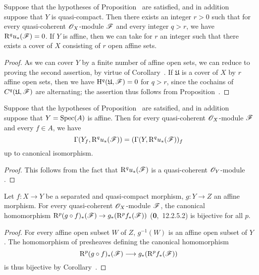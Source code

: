 \begin{corollary}[1.4.12]
\label{III.1.4.12}
Suppose that the hypotheses of Proposition~ are satisfied, and in addition suppose that $Y$ is quasi-compact.
Then there exists an integer $r>0$ such that for every quasi-coherent $\mathscr{O}_X$-module $\mathscr{F}$ and every integer $q>r$, we have $\mathrm{R}^q u_*(\mathscr{F})=0$.
If $Y$ is affine, then we can take for $r$ an integer such that there exists a cover of $X$ consisting of $r$ open affine sets.
\end{corollary}

\begin{proof}
\label{proof-III.1.4.12}
As we can cover $Y$ by a finite number of affine open sets, we can reduce to proving the second assertion, by virtue of Corollary~.
If $\mathfrak{U}$ is a cover of $X$ by $r$ affine open sets, then we have $\mathrm{H}^q(\mathfrak{U},\mathscr{F})=0$ for $q>r$, since the cochains of $C^q(\mathfrak{U},\mathscr{F})$ are alternating; the assertion thus follows from Proposition~.
\end{proof}

\begin{corollary}[1.4.13]
\label{III.1.4.13}
Suppose that the hypotheses of Proposition~ are satsified, and in addition suppose that $Y=\operatorname{Spec}(A)$ is affine.
Then for every quasi-coherent $\mathscr{O}_X$-module $\mathscr{F}$ and every $f\in A$, we have
\[
  \Gamma(Y_f,\mathrm{R}^q u_*(\mathscr{F}))=(\Gamma(Y,\mathrm{R}^q u_*(\mathscr{F}))_f
\]
up to canonical isomorphism.
\end{corollary}

\begin{proof}
\label{proof-III.1.4.13}
This follows from the fact that $\mathrm{R}^q u_*(\mathscr{F})$ is a quasi-coherent $\mathscr{O}_Y$-module .
\end{proof}

\begin{proposition}[1.4.14]
\label{III.1.4.14}
Let $f:X\to Y$ be a separated and quasi-compact morphism, $g:Y\to Z$ an affine morphism.
For every quasi-coherent $\mathscr{O}_X$-module $\mathscr{F}$, the canonical homomorphism $\RR^p(g\circ f)_*(\sh{F})\to g_*(\RR^p f_*(\sh{F}))$ (\textbf{0},~12.2.5.2) is bijective for all $p$.
\end{proposition}

\begin{proof}
\label{proof-III.1.4.14}
For every affine open subset $W$ of $Z$, $g^{-1}(W)$ is an affine open subset of $Y$.
The homomorphism of presheaves defining the canonical homomorphism
\[
  \RR^p(g\circ f)_*(\sh{F})\to g_*(\RR^p f_*(\sh{F}))
\]
 is thus bijective by Corollary~.
\end{proof}

